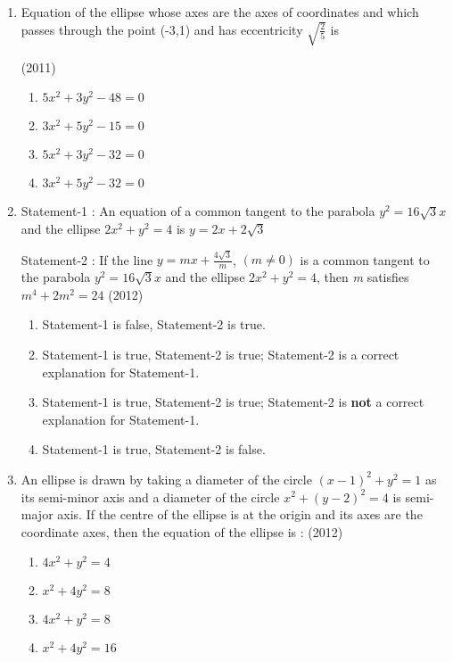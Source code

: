 \documentclass[journal,12pt,twocolumn]{IEEEtran}
\theoremstyle{remark}
\begin{document}
\begin{enumerate}[label=\arabic*.]
    \item Equation of the ellipse whose axes are the axes of coordinates and which passes through the point (-3,1) and has eccentricity $\sqrt{\frac{2}{5}}$ is
    
    \hfill(2011)
    
    \begin{enumerate}[label=(\alph*)]
    \item$5x^2+3y^2-48=0$
    \item$3x^2+5y^2-15=0$
    \item$5x^2+3y^2-32=0$ 
    \item$3x^2+5y^2-32=0$ \\
    \end{enumerate}

    \item
    Statement-1 : An equation of a common tangent to the parabola $y^2=16\sqrt{3}x$ and the ellipse $2x^2+y^2=4$ is $y=2x+2\sqrt{3}$
    
    Statement-2 : If the line $y=mx+\frac{4\sqrt{3}}{m}$, $(m\neq0)$ is a common tangent to the parabola $y^2=16\sqrt{3}x$ and the ellipse $2x^2+y^2=4$, then \textit{m} satisfies $m^4+2m^2=24$ 
    \hfill(2012)
    \begin{enumerate}[label=(\alph*)]
    \item Statement-1 is false, Statement-2 is true.
    \item Statement-1 is true, Statement-2 is true; Statement-2 is a correct explanation for Statement-1.
    \item Statement-1 is true, Statement-2 is true; Statement-2 is \textbf{not} a correct explanation for Statement-1.
    \item Statement-1 is true, Statement-2 is false.\\
    \end{enumerate}
    \item An ellipse is drawn by taking a diameter of the circle $(x-1)^2+y^2=1$ as its semi-minor axis and a diameter of the circle $x^2+(y-2)^2=4$ is semi-major axis. If the centre of the ellipse is at the origin and its axes are the coordinate axes, then the equation of the ellipse is : 
    \hfill(2012)
    
    \begin{enumerate}[label=(\alph*)]
    \item$4x^2+y^2=4$
    \item$x^2+4y^2=8$
    \item$4x^2+y^2=8$
    \item$x^2+4y^2=16$ \\
    \end{enumerate}


\end{enumerate}
\end{document}
